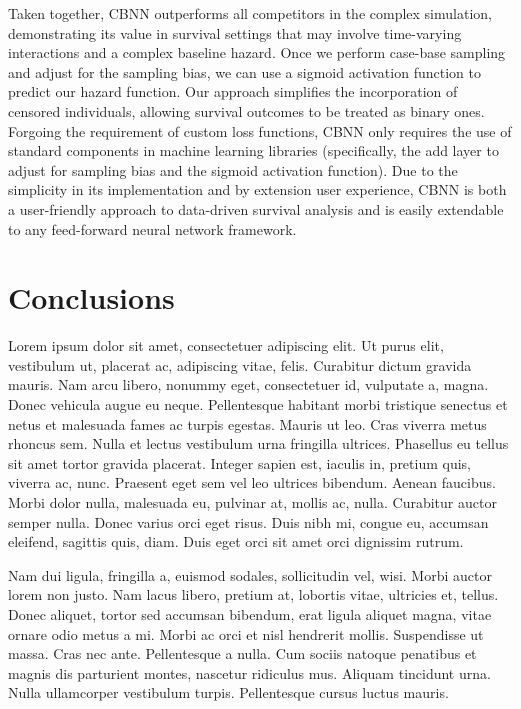 \documentclass[APA,LATO1COL]{WileyNJD-v2}
\begin{document}
Taken together, CBNN outperforms all competitors in the complex
simulation, demonstrating its value in survival settings that may
involve time-varying interactions and a complex baseline hazard. Once we
perform case-base sampling and adjust for the sampling bias, we can use
a sigmoid activation function to predict our hazard function. Our
approach simplifies the incorporation of censored individuals, allowing
survival outcomes to be treated as binary ones. Forgoing the requirement
of custom loss functions, CBNN only requires the use of standard
components in machine learning libraries (specifically, the add layer to
adjust for sampling bias and the sigmoid activation function). Due to
the simplicity in its implementation and by extension user experience,
CBNN is both a user-friendly approach to data-driven survival analysis
and is easily extendable to any feed-forward neural network framework.





\section{Conclusions}\label{sec5}

Lorem ipsum dolor sit amet, consectetuer adipiscing elit. Ut purus elit, vestibulum ut, placerat ac, adipiscing vitae,
felis. Curabitur dictum gravida mauris. Nam arcu libero, nonummy eget, consectetuer id, vulputate a, magna. Donec
vehicula augue eu neque. Pellentesque habitant morbi tristique senectus et netus et malesuada fames ac turpis egestas.
Mauris ut leo. Cras viverra metus rhoncus sem. Nulla et lectus vestibulum urna fringilla ultrices. Phasellus eu tellus
sit amet tortor gravida placerat. Integer sapien est, iaculis in, pretium quis, viverra ac, nunc. Praesent eget sem vel
leo ultrices bibendum. Aenean faucibus. Morbi dolor nulla, malesuada eu, pulvinar at, mollis ac, nulla. Curabitur
auctor semper nulla. Donec varius orci eget risus. Duis nibh mi, congue eu, accumsan eleifend, sagittis quis, diam.
Duis eget orci sit amet orci dignissim rutrum.

Nam dui ligula, fringilla a, euismod sodales, sollicitudin vel, wisi. Morbi auctor lorem non justo. Nam lacus libero,
pretium at, lobortis vitae, ultricies et, tellus. Donec aliquet, tortor sed accumsan bibendum, erat ligula aliquet magna,
vitae ornare odio metus a mi. Morbi ac orci et nisl hendrerit mollis. Suspendisse ut massa. Cras nec ante. Pellentesque
a nulla. Cum sociis natoque penatibus et magnis dis parturient montes, nascetur ridiculus mus. Aliquam tincidunt
urna. Nulla ullamcorper vestibulum turpis. Pellentesque cursus luctus mauris.
\end{document}

